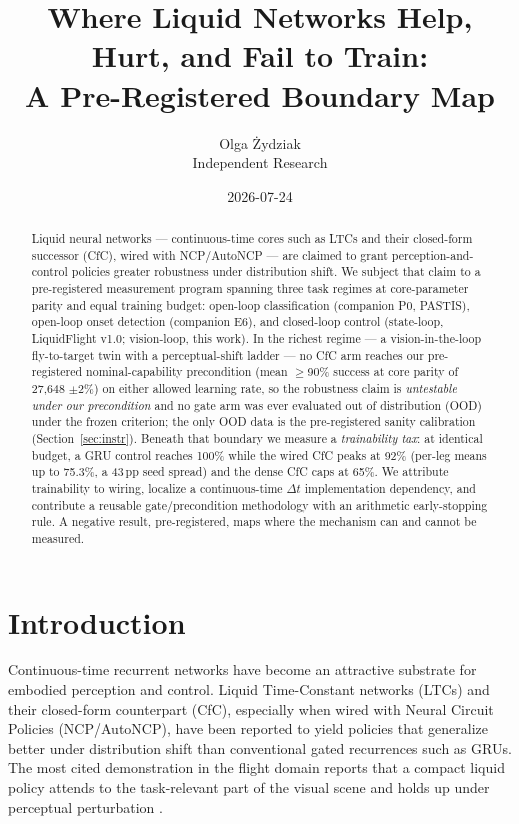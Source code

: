 \documentclass[11pt]{article}
\title{\textbf{Where Liquid Networks Help, Hurt, and Fail to Train:\\ A Pre-Registered Boundary Map}}
\author{Olga \.Zydziak\\ \small Independent Research}
\date{2026-07-24}
\begin{document}
\maketitle

\begin{abstract}
\noindent Liquid neural networks --- continuous-time cores such as LTCs and their closed-form successor (CfC), wired with NCP/AutoNCP --- are claimed to grant perception-and-control policies greater robustness under distribution shift. We subject that claim to a pre-registered measurement program spanning three task regimes at core-parameter parity and equal training budget: open-loop classification (companion P0, PASTIS), open-loop onset detection (companion E6), and closed-loop control (state-loop, LiquidFlight v1.0; vision-loop, this work). In the richest regime --- a vision-in-the-loop fly-to-target twin with a perceptual-shift ladder --- no CfC arm reaches our pre-registered nominal-capability precondition (mean $\geq$90\% success at core parity of 27{,}648 $\pm$2\%) on either allowed learning rate, so the robustness claim is \emph{untestable under our precondition} and no gate arm was ever evaluated out of distribution (OOD) under the frozen criterion; the only OOD data is the pre-registered sanity calibration (Section~\ref{sec:instr}). Beneath that boundary we measure a \emph{trainability tax}: at identical budget, a GRU control reaches 100\% while the wired CfC peaks at 92\% (per-leg means up to 75.3\%, a 43\,pp seed spread) and the dense CfC caps at 65\%. We attribute trainability to wiring, localize a continuous-time $\Delta t$ implementation dependency, and contribute a reusable gate/precondition methodology with an arithmetic early-stopping rule. A negative result, pre-registered, maps where the mechanism can and cannot be measured.
\end{abstract}

\section{Introduction}
Continuous-time recurrent networks have become an attractive substrate for embodied perception and control. Liquid Time-Constant networks (LTCs) and their closed-form counterpart (CfC), especially when wired with Neural Circuit Policies (NCP/AutoNCP), have been reported to yield policies that generalize better under distribution shift than conventional gated recurrences such as GRUs. The most cited demonstration in the flight domain reports that a compact liquid policy attends to the task-relevant part of the visual scene and holds up under perceptual perturbation \citep{chahine2023flight}.
\end{document}
